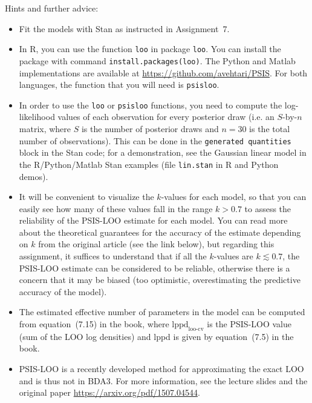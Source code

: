 \documentclass[a4paper,11pt]{article}
\begin{document}
Hints and further advice:
\begin{itemize}
\item Fit the models with Stan as instructed in Assignment~7.
\item In R, you can use the function {\tt loo} in package {\tt loo}. You can install the package with command {\tt install.packages(loo)}. The Python and Matlab implementations are available at \url{https://github.com/avehtari/PSIS}. For both languages, the function that you will need is {\tt psisloo}.
\item In order to use the {\tt loo} or {\tt psisloo} functions, you need to compute the log-likelihood values of each observation for every posterior draw (i.e. an $S$-by-$n$ matrix, where $S$ is the number of posterior draws and $n=30$ is the total number of observations). This can be done in the {\tt generated quantities} block in the Stan code; for a demonstration, see the Gaussian linear model in the R/Python/Matlab Stan examples (file {\tt lin.stan} in R and Python demos).
\item It will be convenient to visualize the $k$-values for each model, so that you can easily see how many of these values fall in the range $k > 0.7$ to assess the reliability of the PSIS-LOO estimate for each model. You can read more about the theoretical guarantees for the accuracy of the estimate depending on $k$ from the original article (see the link below), but regarding this assignment, it suffices to understand that if all the $k$-values are $k \lesssim 0.7$, the PSIS-LOO estimate can be considered to be reliable, otherwise there is a concern that it may be biased (too optimistic, overestimating the predictive accuracy of the model).
\item The estimated effective number of parameters in the model can be computed from equation~(7.15) in the book, where $\text{lppd}_\text{loo-cv}$ is the PSIS-LOO value (sum of the LOO log densities) and lppd is given by equation~(7.5) in the book.
\item PSIS-LOO is a recently developed method for approximating the exact LOO and is thus not in BDA3. For more information, see the lecture slides and the original paper \url{https://arxiv.org/pdf/1507.04544}.
\end{itemize}
\end{document}
